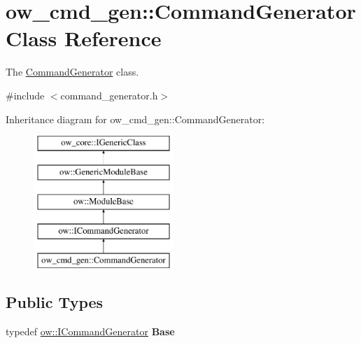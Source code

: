 \hypertarget{classow__cmd__gen_1_1CommandGenerator}{}\section{ow\+\_\+cmd\+\_\+gen\+:\+:Command\+Generator Class Reference}
\label{classow__cmd__gen_1_1CommandGenerator}


The \hyperlink{classow__cmd__gen_1_1CommandGenerator}{Command\+Generator} class.  




{\ttfamily \#include $<$command\+\_\+generator.\+h$>$}

Inheritance diagram for ow\+\_\+cmd\+\_\+gen\+:\+:Command\+Generator\+:\begin{figure}[H]
\begin{center}
\leavevmode
\includegraphics[height=5.000000cm]{dc/d22/classow__cmd__gen_1_1CommandGenerator}
\end{center}
\end{figure}
\subsection*{Public Types}
\begin{DoxyCompactItemize}
\item 
typedef \hyperlink{classow_1_1ICommandGenerator}{ow\+::\+I\+Command\+Generator} {\bfseries Base}\hypertarget{classow__cmd__gen_1_1CommandGenerator_abfa7073053bfec8d4aada5a7fa399ca9}{}\label{classow__cmd__gen_1_1CommandGenerator_abfa7073053bfec8d4aada5a7fa399ca9}

\end{DoxyCompactItemize}
